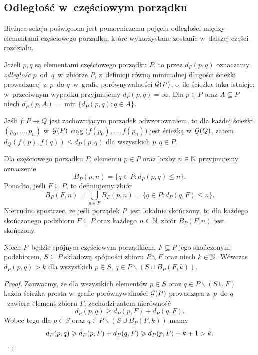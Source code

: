 


\subsection{Odległość w~częściowym porządku}
Bieżąca sekcja poświęcona jest pomocniczemu pojęciu odległości między elementami częściowego porządku, które wykorzystane zostanie w~dalszej części rozdziału.

Jeżeli $p,q$ są elementami częściowego porządku $P$, to przez $d_P(p,q)$ oznaczamy \textit{odległość} $p$~od~$q$~w~zbiorze $P$, z~definicji równą minimalnej długości ścieżki prowadzącej z~$p$~do $q$~w~grafie porównywalności $\Comp(P)$, o~ile ścieżka taka istnieje; w~przeciwnym wypadku przyjmujemy $d_P(p,q)=\infty$. Dla $p\in P$ oraz $A\subseteq P$ niech $d_P(p,A)=\min\{d_P(p,q):q\in A\}$.

Jeśli $f\colon P\to Q$ jest zachowującym porządek odwzorowaniem, to dla każdej ścieżki $(p_0,\ldots,p_n)$ w~$\Comp(P)$ ciąg $\big(f(p_0),\ldots,f(p_n)\big)$ jest ścieżką w~$\Comp(Q)$, zatem $d_Q(f(p),f(q))\leq d_P(p,q)$ dla wszystkich $p,q\in P$.

Dla częściowego porządku $P$, elementu $p\in P$ oraz liczby $n\in \mN$ przyjmujemy oznaczenie \[B_P(p,n)=\{q\in P:d_P(p,q)\leq n\}.\] Ponadto, jeśli $F\subseteq P$, to definiujemy zbiór \[B_P(F,n)=\bigcup_{p\in F}B_P(p,n)=\{q\in P:d_P(q,F)\leq n\}.\]Nietrudno spostrzec, że jeśli porządek $P$~jest lokalnie skończony, to dla każdego skończonego podzbioru $F\subseteq P$ oraz każdego $n\in\mN$~zbiór $B_P(F,n)$ jest skończony.

\begin{lem}\label{lem-odleglosc_miedzy_skladowymi_po_nadmuchaniu_srodka}
Niech $P$~będzie spójnym częściowym porządkiem, $F\subseteq P$ jego skończonym podzbiorem, $S\subseteq P$ składową spójności zbioru $P\smallsetminus F$ oraz niech $k\in\mN$. Wówczas $d_P(p,q)> k$ dla wszystkich $p\in S$, $q\in P\smallsetminus \left(S\cup B_P(F,k)\right)$.
\end{lem}
\begin{proof}
Zauważmy, że dla wszystkich elementów $p\in S$ oraz $q\in P\smallsetminus (S\cup F)$ każda ścieżka prosta w~grafie porównywalności $\Comp(P)$ prowadząca z~$p$~do $q$~zawiera element zbioru $F$; zachodzi zatem nierówność \[d_P(p,q)\geq d_P(p,F)+d_P(q,F).\] Wobec tego dla $p\in S$ oraz $q\in P\smallsetminus \left(S\cup B_P(F,k)\right)$ mamy \[d_P(p,q)\geq d_P(p,F)+d_P(q,F)\geq d_P(p,F)+k+1>k.\qedhere\] 
\end{proof}

